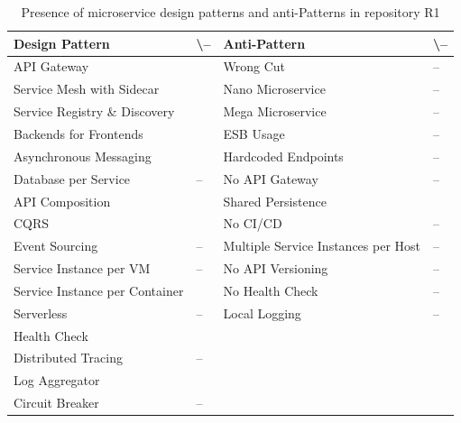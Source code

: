 \documentclass{Configuration_Files/PoliMi3i_thesis}
\newcommand{\cmark}{\ding{51}}%
\begin{document}
\begin{table}[H]
\centering 
    \begin{tabular}{ 
  | >{\centering\arraybackslash} m{16em} 
  | >{\centering\arraybackslash} m{2.2em} 
  | >{\centering\arraybackslash} m{16em} 
  | >{\centering\arraybackslash} m{2.2em} | }
    \hline
    \rowcolor{bluepoli!40}
    \textbf{Design Pattern} & \cmark \textbackslash – & \textbf{Anti-Pattern} & \cmark \textbackslash – \T\B \\
    \hline \hline
    API Gateway & \cmark & Wrong Cut & – \T\B\\
    \hline
    \rowcolor{bluepoli!10}
    Service Mesh with Sidecar & \cmark & Nano Microservice & – \T\B \\
    \hline
    Service Registry \& Discovery & \cmark & Mega Microservice & – \T\B \\
    \hline
    \rowcolor{bluepoli!10}
    Backends for Frontends & \cmark & ESB Usage & – \T\B \\
    \hline
    Asynchronous Messaging & \cmark & Hardcoded Endpoints & – \T\B \\
    \hline
    \rowcolor{bluepoli!10}
    Database per Service & – & No API Gateway & – \T\B \\
    \hline
    API Composition & \cmark & Shared Persistence & \cmark \T\B \\
    \hline
    \rowcolor{bluepoli!10}
    CQRS & \cmark & No CI/CD & – \T\B \\
    \hline
    Event Sourcing & – & Multiple Service Instances per Host & – \T\B \\
    \hline
    \rowcolor{bluepoli!10}
    Service Instance per VM & – & No API Versioning & – \T\B \\
    \hline
    Service Instance per Container & \cmark & No Health Check & – \T\B \\
    \hline
    \rowcolor{bluepoli!10}
    Serverless & – & Local Logging & – \T\B \\
    \hline
    Health Check & \cmark &  & \T\B \\
    \hline
    \rowcolor{bluepoli!10}
    Distributed Tracing & – & & \T\B \\
    \hline
    Log Aggregator & \cmark &  & \T\B \\
    \hline
    \rowcolor{bluepoli!10}
    Circuit Breaker & – &  & \T\B \\
    \hline
    \end{tabular}
    \\[10pt]
    \caption{Presence of microservice design patterns and anti-Patterns in repository R1}
    \label{table:R1_result}
\end{table}
\end{document}
